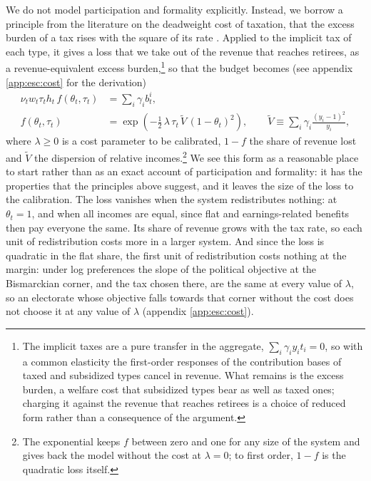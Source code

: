 We do not model participation and formality explicitly. Instead, we borrow a principle from the literature on the deadweight cost of taxation, that the excess burden of a tax rises with the square of its rate \parencite{Harberger64a1}. Applied to the implicit tax of each type, it gives a loss that we take out of the revenue that reaches retirees, as a revenue-equivalent excess burden,\footnote{The implicit taxes are a pure transfer in the aggregate, $\sum_i\gamma_i y_i t_i = 0$, so with a common elasticity the first-order responses of the contribution bases of taxed and subsidized types cancel in revenue. What remains is the excess burden, a welfare cost that subsidized types bear as well as taxed ones; charging it against the revenue that reaches retirees is a choice of reduced form rather than a consequence of the argument.} so that the budget becomes (see appendix \ref{app:esc:cost} for the derivation)
\begin{align}\label{eq:esc:budget}
    \nu_t w_t\tau_th_t\, f(\theta_t,\tau_t) &= \sum_i \gamma_i b_t^i, \\
    f(\theta_t,\tau_t) &= \exp\!\left(-\tfrac{1}{2}\,\lambda\,\tau_t\,\tilde{V}\,(1-\theta_t)^2\right), \qquad \tilde{V} \equiv \sum_i\gamma_i\frac{(y_i-1)^2}{y_i}, \nonumber
\end{align}
where $\lambda \geq 0$ is a cost parameter to be calibrated, $1-f$ the share of revenue lost and $\tilde{V}$ the dispersion of relative incomes.\footnote{The exponential keeps $f$ between zero and one for any size of the system and gives back the model without the cost at $\lambda = 0$; to first order, $1-f$ is the quadratic loss itself.} We see this form as a reasonable place to start rather than as an exact account of participation and formality: it has the properties that the principles above suggest, and it leaves the size of the loss to the calibration. The loss vanishes when the system redistributes nothing: at $\theta_t = 1$, and when all incomes are equal, since flat and earnings-related benefits then pay everyone the same. Its share of revenue grows with the tax rate, so each unit of redistribution costs more in a larger system. And since the loss is quadratic in the flat share, the first unit of redistribution costs nothing at the margin: under log preferences the slope of the political objective at the Bismarckian corner, and the tax chosen there, are the same at every value of $\lambda$, so an electorate whose objective falls towards that corner without the cost does not choose it at any value of $\lambda$ (appendix \ref{app:esc:cost}).

